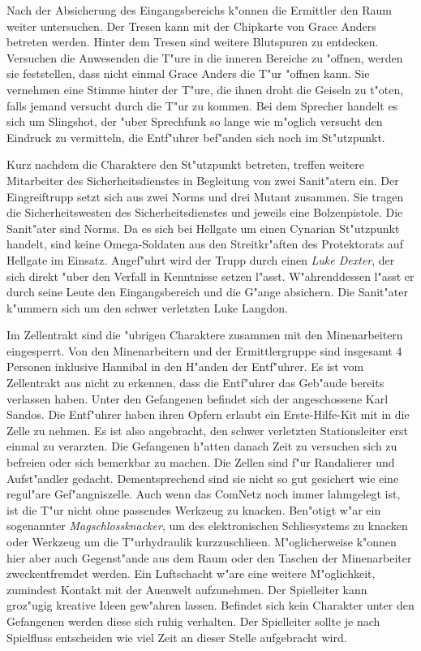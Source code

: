 
Nach der Absicherung des Eingangsbereichs k"onnen die Ermittler den Raum weiter untersuchen. Der Tresen kann mit der Chipkarte von Grace Anders betreten werden. Hinter dem Tresen sind weitere Blutspuren zu entdecken. Versuchen die Anwesenden die T"ure in die inneren Bereiche zu "offnen, werden sie feststellen, dass nicht einmal Grace Anders die T"ur "offnen kann. Sie vernehmen eine Stimme hinter der T"ure, die ihnen droht die Geiseln zu t"oten, falls jemand versucht durch die T"ur zu kommen. Bei dem Sprecher handelt es sich um Slingshot, der "uber Sprechfunk so lange wie m"oglich versucht den Eindruck zu vermitteln, die Entf"uhrer bef"anden sich noch im St"utzpunkt. 

Kurz nachdem die Charaktere den St"utzpunkt betreten, treffen weitere Mitarbeiter des Sicherheitsdienstes in Begleitung von zwei Sanit"atern ein. Der Eingreiftrupp setzt sich aus zwei Norms und drei Mutant zusammen. Sie tragen die Sicherheitswesten des Sicherheitsdienstes und jeweils eine Bolzenpistole. Die Sanit"ater sind Norms. Da es sich bei Hellgate um einen Cynarian St"utzpunkt handelt, sind keine Omega-Soldaten aus den Streitkr"aften des Protektorats auf Hellgate im Einsatz. Angef"uhrt wird der Trupp durch einen \emph{Luke Dexter}, der sich direkt "uber den Verfall in Kenntnisse setzen l"asst. W"ahrenddessen l"asst er durch seine Leute den Eingangsbereich und die G"ange absichern. Die Sanit"ater k"ummern sich um den schwer verletzten Luke Langdon.


Im Zellentrakt sind die "ubrigen Charaktere zusammen mit den Minenarbeitern eingesperrt. Von den Minenarbeitern und der Ermittlergruppe sind insgesamt 4 Personen inklusive Hannibal in den H"anden der Entf"uhrer. Es ist vom Zellentrakt aus nicht zu erkennen, dass die Entf"uhrer das Geb"aude bereits verlassen haben. Unter den Gefangenen befindet sich der angeschossene Karl Sandos. Die Entf"uhrer haben ihren Opfern erlaubt ein Erste-Hilfe-Kit mit in die Zelle zu nehmen. Es ist also angebracht, den schwer verletzten Stationsleiter erst einmal zu verarzten. Die Gefangenen h"atten danach Zeit zu versuchen sich zu befreien oder sich bemerkbar zu machen. Die Zellen sind f"ur Randalierer und Aufst"andler gedacht. Dementsprechend sind sie nicht so gut gesichert wie eine regul"are Gef"angniszelle. Auch wenn das ComNetz noch immer lahmgelegt ist, ist die T"ur nicht ohne passendes Werkzeug zu knacken. Ben"otigt w"ar ein sogenannter \emph{Magschlossknacker}, um des elektronischen Schlie\3systems zu knacken oder Werkzeug um die T"urhydraulik kurzzuschlie\3en. M"oglicherweise k"onnen hier aber auch Gegenst"ande aus dem Raum oder den Taschen der Minenarbeiter zweckentfremdet werden. Ein Luftschacht w"are eine weitere M"oglichkeit, zumindest Kontakt mit der Au\3enwelt aufzunehmen. Der Spielleiter kann gro\3z"ugig kreative Ideen gew"ahren lassen. Befindet sich kein Charakter unter den Gefangenen werden diese sich ruhig verhalten. Der Spielleiter sollte je nach Spielfluss entscheiden wie viel Zeit an dieser Stelle aufgebracht wird. 

